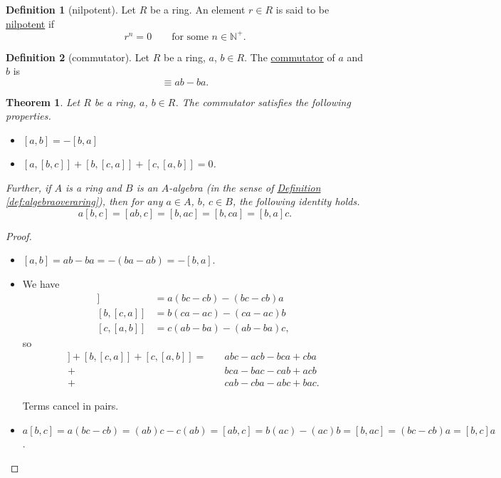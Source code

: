 \documentclass[a4paper]{report}
\newcommand{\N}{\mathbb{N}}
\newcommand{\defn}[1]{\ul{#1}}
\theoremstyle{definition}
\newtheorem{definition}{Definition}[section]
\theoremstyle{plain}
\newtheorem{theorem}{Theorem}[section]
\theoremstyle{remark}
\begin{document}
\begin{definition}[nilpotent]
  \label{def:nilpotent}
  Let $R$ be a ring. An element $r \in R$ is said to be \defn{nilpotent} if 
  \begin{equation*}
    r^{n} = 0\qquad\text{for some } n \in \N^{+}.
  \end{equation*}
\end{definition}
\begin{definition}[commutator]
  \label{def:commutator}
  Let $R$ be a ring, $a$, $b \in R$. The \defn{commutator} of $a$ and $b$ is 
  \begin{equation*}
    [a,b] \equiv ab-ba.
  \end{equation*}
\end{definition}
\begin{theorem}
  \label{thm:propertiesofcommutator}
  Let $R$ be a ring, $a$, $b \in R$. The commutator satisfies the following properties.
  \begin{itemize}
    \item $[a,b] = -[b,a]$
    \item $[a,[b,c]] + [b,[c,a]] + [c,[a,b]] = 0$.
  \end{itemize}
  Further, if $A$ is a ring and $B$ is an $A$-algebra (in the sense of \hyperref[def:algebraoveraring]{Definition \ref*{def:algebraoveraring}}), then for any $a\in A$, $b$, $c \in B$, the following identity holds.
  \begin{equation*}
    a[b,c] = [ab,c] = [b,ac] = [b,ca] = [b,a]c.
  \end{equation*}
\end{theorem}
\begin{proof}
  $\,$
  \begin{itemize}
    \item $[a,b] = ab-ba=-(ba-ab)=-[b,a]$.
    \item We have 
      \begin{align*}
        [a,[b,c]] &= a(bc-cb) - (bc-cb)a \\
        [b,[c,a]] &= b(ca-ac) - (ca-ac)b \\
        [c,[a,b]] &= c(ab-ba) - (ab-ba)c,
      \end{align*}
      so
      \begin{align*}
        [a,[b,c]]+[b,[c,a]]+[c,[a,b]] =\quad& abc - acb - bca + cba \\
        +& bca - bac - cab + acb \\
        +& cab - cba - abc + bac.
      \end{align*}

      Terms cancel in pairs.

    \item $a[b,c] = a(bc-cb) = (ab)c - c(ab) = [ab,c] = b(ac)-(ac)b = [b,ac] = (bc-cb)a = [b,c]a$.
  \end{itemize}
\end{proof}
\end{document}
